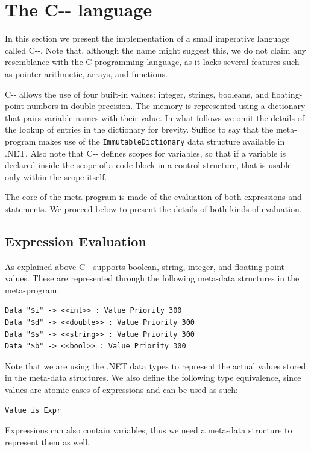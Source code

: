 \section{The C-{}- language}
In this section we present the implementation of a small imperative language called C-{}-. Note that, although the name might suggest this, we do not claim any resemblance with the C programming language, as it lacks several features such as pointer arithmetic, arrays, and functions.

C-{}- allows the use of four built-in values: integer, strings, booleans, and floating-point numbers in double precision. The memory is represented using a dictionary that pairs variable names with their value. In what follows we omit the details of the lookup of entries in the dictionary for brevity. Suffice to say that the meta-program makes use of the \texttt{ImmutableDictionary} data structure available in .NET. Also note that C-{}- defines scopes for variables, so that if a variable is declared inside the scope of a code block in a control structure, that is usable only within the scope itself.

The core of the meta-program is made of the evaluation of both expressions and statements. We proceed below to present the details of both kinds of evaluation.

\subsection{Expression Evaluation}
As explained above C-{}- supports boolean, string, integer, and floating-point values. These are represented through the following meta-data structures in the meta-program.

\begin{lstlisting}
Data "$i" -> <<int>> : Value Priority 300
Data "$d" -> <<double>> : Value Priority 300
Data "$s" -> <<string>> : Value Priority 300
Data "$b" -> <<bool>> : Value Priority 300
\end{lstlisting}

\noindent
Note that we are using the .NET data types to represent the actual values stored in the meta-data structures. We also define the following type equivalence, since values are atomic cases of expressions and can be used as such:

\begin{lstlisting}
Value is Expr
\end{lstlisting}

\noindent
Expressions can also contain variables, thus we need a meta-data structure to represent them as well.

